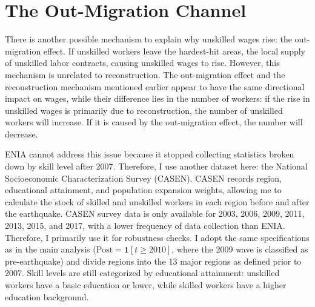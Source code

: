 \documentclass[12pt]{article}
\begin{document}
\FloatBarrier
\section{The Out-Migration Channel}\label{sec:migration}

There is another possible mechanism to explain why unskilled wages rise: the out-migration effect. If
unskilled workers leave the hardest-hit areas, the local supply of unskilled labor contracts, causing
unskilled wages to rise. However, this mechanism is unrelated to reconstruction. The out-migration
effect and the reconstruction mechanism mentioned earlier appear to have the same directional impact on
wages, while their difference lies in the number of workers: if the rise in unskilled wages is primarily
due to reconstruction, the number of unskilled workers will increase. If it is caused by the
out-migration effect, the number will decrease.

ENIA cannot address this issue because it stopped collecting statistics broken down by skill level after
2007. Therefore, I use another dataset here: the National Socioeconomic Characterization Survey (CASEN).
CASEN records region, educational attainment, and population expansion weights, allowing me to calculate
the stock of skilled and unskilled workers in each region before and after the earthquake. CASEN survey
data is only available for 2003, 2006, 2009, 2011, 2013, 2015, and 2017, with a lower frequency of data
collection than ENIA. Therefore, I primarily use it for robustness checks. I adopt the same
specifications as in the main analysis ($\text{Post} = \mathbf{1}[t\geq 2010]$, where the 2009 wave is
classified as pre-earthquake) and divide regions into the 13 major regions as defined prior to 2007.
Skill levels are still categorized by educational attainment: unskilled workers have a basic education
or lower, while skilled workers have a higher education background.
\end{document}
